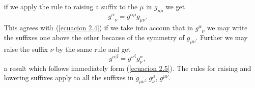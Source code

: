 if we apply the rule to raising a suffix to the $\mu$ in $g_{\mu\rho}$ we get
\[
 {g^{\alpha}}_{\nu} = g^{\alpha\mu} g_{\mu\nu}.
\]
This agrees with (\ref{ecuacion 2.4}) if we take into accoun that in ${g^{\alpha}}_{\nu}$ we may write the suffixes one above the other because of the symmetry of $g_{\mu\nu}$. Further we may raise the suffix $\nu$ by the same rule and get
\[
 g^{\alpha\beta} = g^{\nu\beta} g^{\alpha}_{\nu},
\]
a result which follows immediately form (\ref{ecuacion 2.5}). The rules for raising and lowering suffixes apply to all the suffixes in $g_{\mu\nu}$, $g^{\mu}_{\nu}$, $g^{\mu\nu}$.








